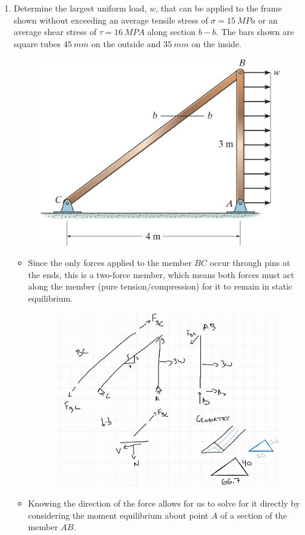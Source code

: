 \documentclass[12pt, oneside]{article}
\begin{document}
\begin{enumerate}
	\item %
		Determine the largest uniform load, $w$, that can be applied to the frame shown without exceeding an average tensile stress of $\sigma = \SI{15}{MPa}$ or an average shear stress of $\tau = \SI{16}{MPA}$ along section $b-b$.
		The bars shown are square tubes $\SI{45}{mm}$ on the outside and $\SI{35}{mm}$ on the inside.
		\begin{figure}[H]
			\centering
			\includegraphics[width=0.6\linewidth]{truss}
			\label{fig:truss}
		\end{figure}
		\begin{itemize}
			\item Since the only forces applied to the member $BC$ occur through pins at the ends, this is a two-force member, which means both forces must act along the member (pure tension/compression) for it to remain in static equilibrium.
				\begin{figure}[H]
					\centering
					\includegraphics[width=0.7\linewidth]{hw1-4}
				\end{figure}
			\item Knowing the direction of the force allows for us to solve for it directly by considering the moment equilibrium about point $A$ of a section of the member $AB$.
			\begin{align*}

\end{align*}
\end{itemize}
\end{enumerate}
\end{document}
